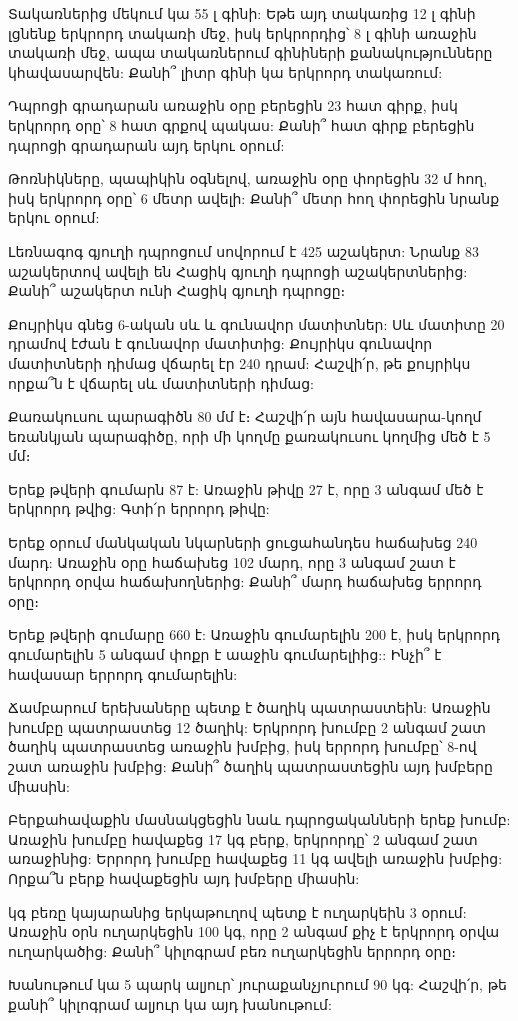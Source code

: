 \problem
Տակառներից մեկում կա 55 լ գինի: Եթե այդ տակառից 12 լ 
գինի լցնենք երկրորդ տակառի մեջ, իսկ երկրորդից՝ 8 լ գինի 
առաջին տակառի մեջ, ապա տակառներում գինիների քանակությունները 
կհավասարվեն: Քանի՞ լիտր գինի կա երկրորդ տակառում:

\problem
Դպրոցի գրադարան առաջին օրը բերեցին 23 հատ գիրք, իսկ երկրորդ 
օրը՝ 8 հատ գրքով պակաս: Քանի՞ հատ գիրք բերեցին դպրոցի գրադարան 
այդ երկու օրում:

\problem
Թոռնիկները, պապիկին օգնելով, առաջին օրը փորեցին 32 մ հող, իսկ 
երկրորդ օրը՝ 6 մետր ավելի: Քանի՞ մետր հող փորեցին նրանք երկու օրում:

\problem
Լեռնագոգ գյուղի դպրոցում սովորում է 425 աշակերտ: Նրանք 83 
աշակերտով ավելի են Հացիկ գյուղի դպրոցի աշակերտներից: Քանի՞ 
աշակերտ ունի Հացիկ գյուղի դպրոցը։

\problem
Քույրիկս գնեց 6-ական սև և գունավոր մատիտներ: Սև մատիտը 20 
դրամով էժան է գունավոր մատիտից: Քույրիկս գունավոր մատիտների 
դիմաց վճարել էր 240 դրամ: Հաշվի՛ր, թե քույրիկս որքա՞ն է վճարել 
սև մատիտների դիմաց:

\problem
Քառակուսու պարագիծն 80 մմ է։ Հաշվի՛ր այն հավասարա-կողմ եռանկյան 
պարագիծը, որի մի կողմը քառակուսու կողմից մեծ է 5 մմ։

\problem
Երեք թվերի գումարն 87 է: Առաջին թիվը 27 է, որը 3 անգամ մեծ է 
երկրորդ թվից: Գտի՛ր երրորդ թիվը:

\problem
Երեք օրում մանկական նկարների ցուցահանդես հաճախեց 240 մարդ: Առաջին 
օրը հաճախեց 102 մարդ, որը 3 անգամ շատ է երկրորդ օրվա հաճախողներից: 
Քանի՞ մարդ հաճախեց երրորդ օրը։

\problem
Երեք թվերի գումարը 660 է: Առաջին գումարելին 200 է, իսկ երկրորդ 
գումարելին 5 անգամ փոքր է աաջին գումարելիից:: Ինչի՞ է հավասար 
երրորդ գումարելին:

\problem
Ճամբարում երեխաները պետք է ծաղիկ պատրաստեին: Առաջին խումբը 
պատրաստեց 12 ծաղիկ: Երկրորդ խումբը 2 անգամ շատ ծաղիկ պատրաստեց 
առաջին խմբից, իսկ երրորդ խումբը՝ 8-ով շատ առաջին խմբից: Քանի՞ 
ծաղիկ պատրաստեցին այդ խմբերը միասին:

\problem
Բերքահավաքին մասնակցեցին նաև դպրոցականների երեք խումբ: Առաջին 
խումբը հավաքեց 17 կգ բերք, երկրորդը՝ 2 անգամ շատ առաջինից: Երրորդ 
խումբը հավաքեց 11 կգ ավելի առաջին խմբից: Որքա՞ն բերք հավաքեցին 
այդ խմբերը միասին:

 կգ բեռը կայարանից երկաթուղով պետք է ուղարկեին 3 օրում: Առաջին 
օրն ուղարկեցին 100 կգ, որը 2 անգամ քիչ է երկրորդ օրվա ուղարկածից: 
Քանի՞ կիլոգրամ բեռ ուղարկեցին երրորդ օրը։

\problem
Խանութում կա 5 պարկ ալյուր՝ յուրաքանչյուրում 90 կգ: Հաշվի՛ր, թե 
քանի՞ կիլոգրամ ալյուր կա այդ խանութում:

